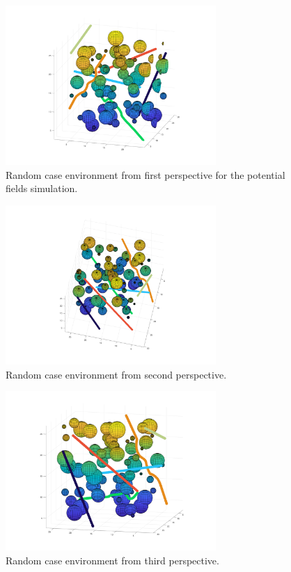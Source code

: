 \documentclass[journal]{IEEEtran}
\begin{document}
	\begin{figure}[H]
			\centering
			\includegraphics[width=8cm]{Results/Potentialfields/env_1}
			\caption{Random case environment from first perspective for the potential fields simulation.}
			\label{fig:env_1}
		\end{figure}	
		\begin{figure}[H]
			\centering
			\includegraphics[width=8cm]{Results/Potentialfields/env_2}
			\caption{Random case environment from second perspective.}
			\label{fig:env_2}
		\end{figure}	
		\begin{figure}[H]
			\centering
			\includegraphics[width=8cm]{Results/Potentialfields/env_3}
			\caption{Random case environment from third perspective.}
			\label{fig:env_3}
		\end{figure}	
\end{document}
